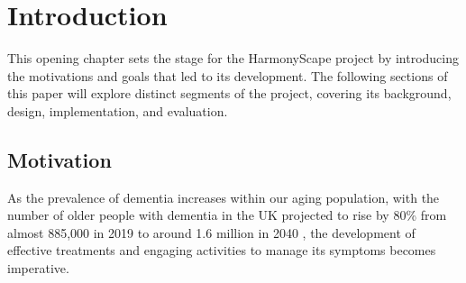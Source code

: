\documentclass{l4proj}
\begin{document}
\tableofcontents

%
%
%
%
%
%
%
%
\chapter{Introduction}


This opening chapter sets the stage for the HarmonyScape project by introducing the motivations and goals that led to its development. The following sections of this paper will explore distinct segments of the project, covering its background, design, implementation, and evaluation.

\section{Motivation}

As the prevalence of dementia increases within our aging population, with the number of older people with dementia in the UK projected to rise by 80\% from almost 885,000 in 2019 to around 1.6 million in 2040 \citep{wittenberg_projections_2019}, the development of effective treatments and engaging activities to manage its symptoms becomes imperative.
\end{document}

